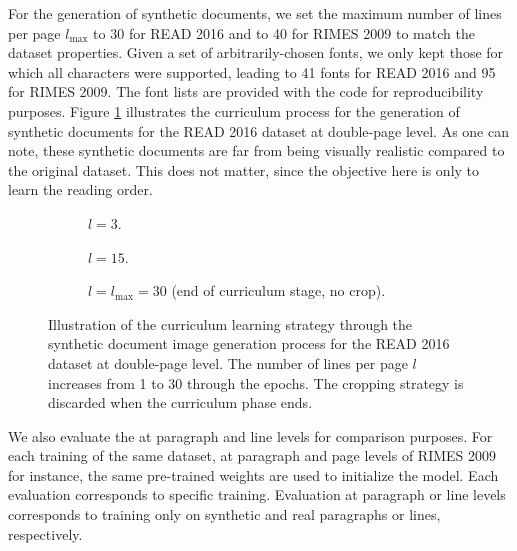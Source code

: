 For the generation of synthetic documents, we set the maximum number of lines per page $l_\mathrm{max}$ to 30 for READ 2016 and to 40 for RIMES 2009 to match the dataset properties. Given a set of arbitrarily-chosen fonts, we only kept those for which all characters were supported, leading to 41 fonts for READ 2016 and 95 for RIMES 2009. The font lists are provided with the code for reproducibility purposes. Figure \ref{fig:syn} illustrates the curriculum process for the generation of synthetic documents for the READ 2016 dataset at double-page level. As one can note, these synthetic documents are far from being visually realistic compared to the original dataset. This does not matter, since the objective here is only to learn the reading order.

\begin{figure}[ht]
    \centering
    \begin{subfigure}[b]{\linewidth}
    {
    \setlength{\fboxsep}{0pt}\setlength{\fboxrule}{1pt}}
    \caption{$l=3$.}
    \end{subfigure}
    \par\medskip
    \begin{subfigure}[b]{\linewidth}
        {
    \setlength{\fboxsep}{0pt}\setlength{\fboxrule}{1pt}}
    \caption{$l=15$.}
    \end{subfigure}
    \par\medskip
    \begin{subfigure}[b]{\linewidth}
        {
    \setlength{\fboxsep}{0pt}\setlength{\fboxrule}{1pt}}
    \caption{$l=l_\mathrm{max}=30$ (end of curriculum stage, no crop).}
    \end{subfigure}
    
    \caption{Illustration of the curriculum learning strategy through the synthetic document image generation process for the READ 2016 dataset at double-page level. The number of lines per page $l$ increases from 1 to 30 through the epochs. The cropping strategy is discarded when the curriculum phase ends.}
    \label{fig:syn}
\end{figure}

We also evaluate the \modelacc{} at paragraph and line levels for comparison purposes. For each training of the same dataset, at paragraph and page levels of RIMES 2009 for instance, the same pre-trained weights are used to initialize the model. Each evaluation corresponds to specific training. Evaluation at paragraph or line levels corresponds to training only on synthetic and real paragraphs or lines, respectively. 

